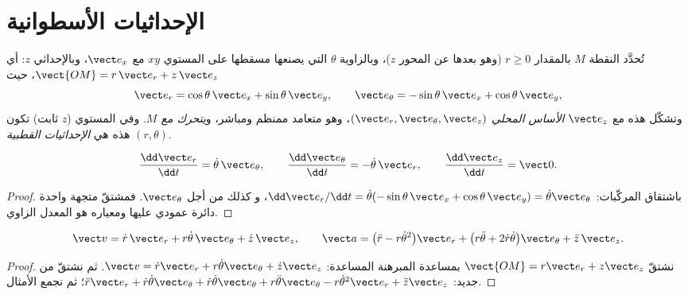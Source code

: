 \section{الإحداثيات الأسطوانية}

\begin{definition}\label{def:b1:point-kinematics:cylindrical}
تُحدَّد النقطة $M$ بالمقدار $r \geq 0$ (وهو بعدها عن المحور $z$)، وبالزاوية
$\theta$ التي يصنعها مسقطها على المستوي $xy$ مع $\vect e_x$،
وبالإحداثي $z$: أي $\vect{OM} = r\,\vect e_r + z\,\vect e_z$، حيث
\[
\vect e_r = \cos\theta\,\vect e_x + \sin\theta\,\vect e_y, \qquad
\vect e_\theta = -\sin\theta\,\vect e_x + \cos\theta\,\vect e_y,
\]
وتشكّل هذه مع $\vect e_z$ \emph{الأساس المحلي} $(\vect e_r, \vect e_\theta,
\vect e_z)$، وهو متعامد ممنظم ومباشر، و\emph{يتحرك مع $M$}. وفي
المستوي ($z$ ثابت) تكون هذه هي \emph{الإحداثيات القطبية} $(r, \theta)$.
\end{definition}

\begin{lemma}\label{lem:b1:point-kinematics:basisderiv}
\[
\frac{\dd\vect e_r}{\dd t} = \dot\theta\,\vect e_\theta, \qquad
\frac{\dd\vect e_\theta}{\dd t} = -\dot\theta\,\vect e_r, \qquad
\frac{\dd\vect e_z}{\dd t} = \vect 0 .
\]
\end{lemma}

\begin{proof}
باشتقاق المركّبات: $\dd\vect e_r/\dd t = \dot\theta(-\sin\theta\,
\vect e_x + \cos\theta\,\vect e_y) = \dot\theta\vect e_\theta$، و
كذلك من أجل $\vect e_\theta$. فمشتقّ متجهة واحدة دائرة
عمودي عليها ومعياره هو المعدل الزاوي.
\end{proof}

\begin{theorem}\label{thm:b1:point-kinematics:cylindrical}
\[
\vect v = \dot r\,\vect e_r + r\dot\theta\,\vect e_\theta + \dot z\,\vect e_z,
\qquad
\vect a = \big(\ddot r - r\dot\theta^2\big)\vect e_r
+ \big(r\ddot\theta + 2\dot r\dot\theta\big)\vect e_\theta + \ddot z\,\vect e_z .
\]
\end{theorem}

\begin{proof}
نشتقّ $\vect{OM} = r\vect e_r + z\vect e_z$ بمساعدة المبرهنة المساعدة:
$\vect v = \dot r\vect e_r + r\dot\theta\vect e_\theta + \dot z\vect e_z$.
ثم نشتقّ من جديد: $\ddot r\vect e_r + \dot r\dot\theta\vect e_\theta +
\dot r\dot\theta\vect e_\theta + r\ddot\theta\vect e_\theta - r\dot\theta^2
\vect e_r + \ddot z\vect e_z$؛ ثم نجمع الأمثال.
\end{proof}

